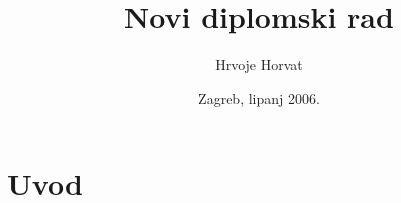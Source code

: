 \documentclass[12pt]{hrdipl}
\author{Hrvoje Horvat}
\title{Novi diplomski rad}
\date{Zagreb, lipanj 2006.}
\begin{document}
\titlepage

\tableofcontents


\chapter{Uvod}


%
\end{document}
